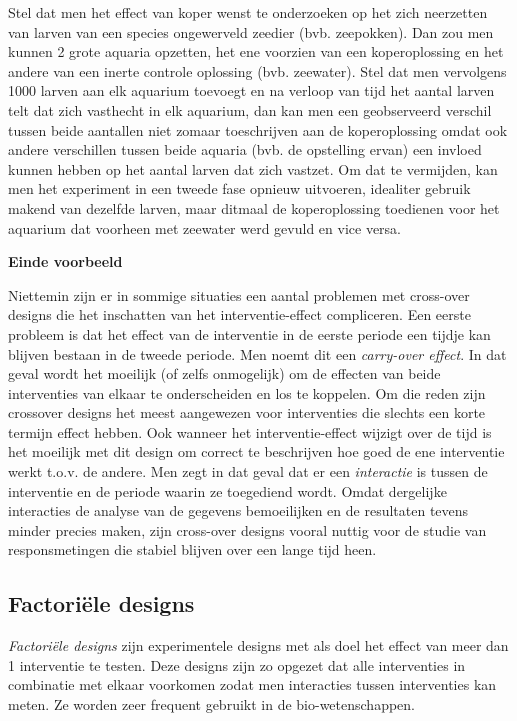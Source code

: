 \documentclass[
  12pt,dutch,coursenotes]{book}
\theoremstyle{definition}
\theoremstyle{definition}
\theoremstyle{definition}
\theoremstyle{remark}
\begin{document}
Stel dat men het effect van koper wenst te onderzoeken op het zich neerzetten van larven van een species ongewerveld zeedier (bvb. zeepokken). Dan zou men kunnen 2 grote aquaria opzetten, het ene voorzien van een koperoplossing en het andere van een inerte controle oplossing (bvb. zeewater). Stel dat men vervolgens 1000 larven aan elk aquarium toevoegt en na verloop van tijd het aantal larven telt dat zich vasthecht in elk aquarium, dan kan men een geobserveerd verschil tussen beide aantallen niet zomaar toeschrijven aan de koperoplossing omdat ook andere verschillen tussen beide aquaria (bvb. de opstelling ervan) een invloed kunnen hebben op het aantal larven dat zich vastzet. Om dat te vermijden, kan men het experiment in een tweede fase opnieuw uitvoeren, idealiter gebruik makend van dezelfde larven, maar ditmaal de koperoplossing toedienen voor het aquarium dat voorheen met zeewater werd gevuld en vice versa.

\textbf{Einde voorbeeld}

Niettemin zijn er in sommige situaties een aantal problemen met cross-over
designs die het inschatten van het interventie-effect compliceren. Een
eerste probleem is dat het effect van de interventie in de eerste periode
een tijdje kan blijven bestaan in de tweede periode. Men noemt dit een
\emph{carry-over effect}. In dat geval wordt het moeilijk (of zelfs
onmogelijk) om de effecten van beide interventies van elkaar te
onderscheiden en los te koppelen. Om die reden zijn crossover designs het meest aangewezen voor interventies die slechts een korte termijn effect hebben. Ook wanneer het interventie-effect wijzigt over de tijd
is het moeilijk met dit design om correct te beschrijven hoe goed
de ene interventie werkt t.o.v. de andere. Men zegt in dat geval dat er een
\emph{interactie} is tussen de interventie en de periode waarin ze
toegediend wordt. Omdat dergelijke interacties de analyse van de gegevens
bemoeilijken en de resultaten tevens minder precies maken, zijn cross-over
designs vooral nuttig voor de studie van responsmetingen die stabiel
blijven over een lange tijd heen.

\hypertarget{factoriuxeble-designs}{%
\subsection{Factoriële designs}\label{factoriuxeble-designs}}

\emph{Factoriële designs} zijn experimentele designs met als doel het effect van
meer dan 1 interventie te testen. Deze designs zijn zo opgezet dat alle interventies in combinatie met elkaar voorkomen zodat men interacties
tussen interventies kan meten. Ze worden zeer frequent gebruikt in de bio-wetenschappen.
\end{document}
